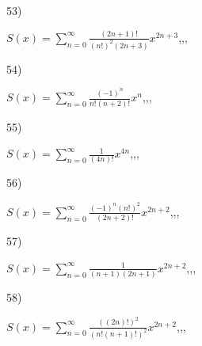 \documentclass[11pt, ukrainian]{article}
\begin{document}
\par
\vspace{0.9cm}
53) \space 
{%
{$S(x)=\sum\limits_{n=0}^{\infty}{\frac{(2n+1)!}{(n!)^2(2n+3)}}{x^{{2n+3}}}$},,, \par \smallskip  
}
\par
\vspace{0.9cm}
54) \space 
{%
{$S(x)=\sum\limits_{n=0}^{\infty}{\frac{(-1)^n}{n!(n+2)!}}{x^{{n}}}$},,, \par \smallskip  
}
\par
\vspace{0.9cm}
55) \space 
{%
{$S(x)=\sum\limits_{n=0}^{\infty}{\frac{1}{(4n)!}}{x^{{4n}}}$},,, \par \smallskip  
}
\par
\vspace{0.9cm}
56) \space 
{%
{$S(x)=\sum\limits_{n=0}^{\infty}{\frac{{(-1)^n}{(n!)^2}}{(2n+2)!}}{x^{{2n+2}}}$},,, \par \smallskip  
}
\par
\newpage
57) \space 
{%
{$S(x)=\sum\limits_{n=0}^{\infty}{\frac{1}{(n+1)(2n+1)}}{x^{{2n+2}}}$},,, \par \smallskip  
}
\par
\vspace{0.9cm}
58) \space 
{%
{$S(x)=\sum\limits_{n=0}^{\infty}{\frac{((2n)!)^2}{(n!(n+1)!)^2}}{x^{{2n+2}}}$},,, \par \smallskip  
}
\end{document}
